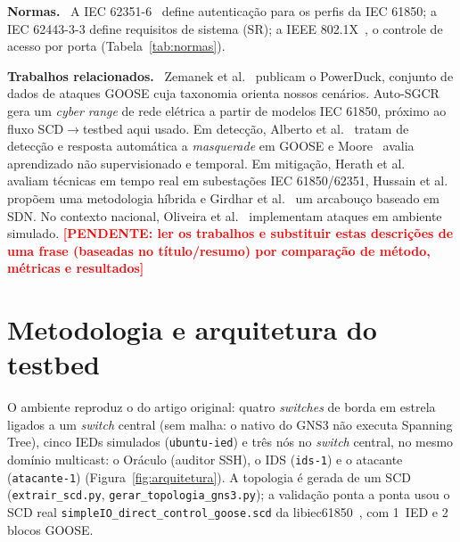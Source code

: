 \documentclass[12pt]{article}
\renewcommand{\paragraph}[1]{\par\noindent\textbf{#1}\ }
\newcommand{\todo}[1]{\textcolor{red}{\textbf{[PENDENTE: #1]}}}
\begin{document}
\paragraph{Normas.} A IEC 62351-6~\cite{iec62351-6} define autentica\c{c}\~ao para os perfis da IEC 61850; a IEC 62443-3-3 define requisitos de sistema (SR); a IEEE 802.1X~\cite{ieee8021x}, o controle de acesso por porta (Tabela~\ref{tab:normas}).

\paragraph{Trabalhos relacionados.} Zemanek et al.~\cite{zemanek2022powerduck} publicam o PowerDuck, conjunto de dados de ataques GOOSE cuja taxonomia orienta nossos cen\'arios. Auto-SGCR~\cite{roomi2025autosgcr} gera um \emph{cyber range} de rede el\'etrica a partir de modelos IEC 61850, pr\'oximo ao fluxo SCD$\rightarrow$testbed aqui usado. Em detec\c{c}\~ao, Alberto et al.~\cite{alberto2026gooseidrs} tratam de detec\c{c}\~ao e resposta autom\'atica a \emph{masquerade} em GOOSE e Moore~\cite{moore2026anomaly} avalia aprendizado n\~ao supervisionado e temporal. Em mitiga\c{c}\~ao, Herath et al.~\cite{herath2025evaluation} avaliam t\'ecnicas em tempo real em subesta\c{c}\~oes IEC 61850/62351, Hussain et al.~\cite{hussain2023hybrid} prop\~oem uma metodologia h\'ibrida e Girdhar et al.~\cite{girdhar2023sdn} um arcabou\c{c}o baseado em SDN. No contexto nacional, Oliveira et al.~\cite{oliveira2023ataques} implementam ataques em ambiente simulado. \todo{ler os trabalhos e substituir estas descri\c{c}\~oes de uma frase (baseadas no t\'itulo/resumo) por compara\c{c}\~ao de m\'etodo, m\'etricas e resultados}

\section{Metodologia e arquitetura do testbed}\label{sec:metodo}

O ambiente reproduz o do artigo original: quatro \emph{switches} de borda em estrela ligados a um \emph{switch} central (sem malha: o nativo do GNS3 n\~ao executa Spanning Tree), cinco IEDs simulados (\texttt{ubuntu-ied}) e tr\^es n\'os no \emph{switch} central, no mesmo dom\'inio multicast: o Or\'aculo (auditor SSH), o IDS (\texttt{ids-1}) e o atacante (\texttt{atacante-1}) (Figura~\ref{fig:arquitetura}). A topologia \'e gerada de um SCD (\texttt{extrair\_scd.py}, \texttt{gerar\_topologia\_gns3.py}); a valida\c{c}\~ao ponta a ponta usou o SCD real \texttt{simpleIO\_direct\_control\_goose.scd} da libiec61850~\cite{libiec61850}, com 1~IED e 2 blocos GOOSE.
\end{document}
